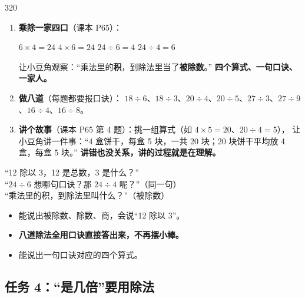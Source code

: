\begin{lesson}{3}{20}
\begin{enumerate}
  \item \textbf{乘除一家四口}（课本 P65）：
        \begin{center}
        $6\times4=24$ \qquad $4\times6=24$ \qquad $24\div6=4$ \qquad $24\div4=6$
        \end{center}
        让小豆角观察：“乘法里的\textbf{积}，到除法里当了\textbf{被除数}。”
        \textbf{四个算式、一句口诀、一家人。}
  \item \textbf{做八道}（每题都要报口诀）：
        $18\div6$、$18\div3$、$20\div4$、$20\div5$、$27\div3$、$27\div9$、$16\div4$、$16\div8$。
  \item \textbf{讲个故事}（课本 P65 第 4 题）：挑一组算式（如 $4\times5=20$、$20\div4=5$），
        让小豆角讲一件事：“4 盒饼干，每盒 5 块，一共 20 块；20 块饼干平均放 4 盒，每盒 5 块。”
        \textbf{讲错也没关系，讲的过程就是在理解。}
\end{enumerate}

\begin{saybox}
“12 除以 3，12 是总数，3 是什么？”\\
“$24\div6$ 想哪句口诀？那 $24\div4$ 呢？”（同一句）\\
“乘法里的积，到除法里叫什么？”（被除数）
\end{saybox}

\begin{passbox}
\begin{itemize}
  \item 能说出被除数、除数、商，会说“12 除以 3”。
  \item \textbf{八道除法全用口诀直接答出来，不再摆小棒。}
  \item 能说出一句口诀对应的四个算式。
\end{itemize}
\end{passbox}
\end{lesson}

\subsection{任务 4：“是几倍”要用除法}

